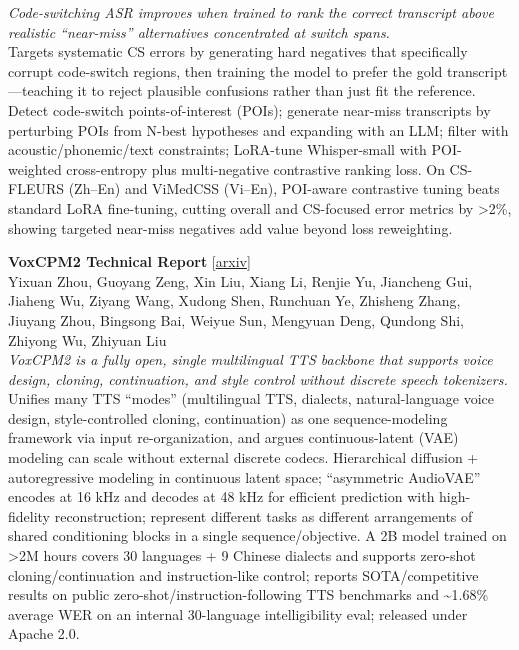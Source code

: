 \documentclass[12pt,letterpaper]{article}
\begin{document}
{\small\textit{Code-switching ASR improves when trained to rank the correct transcript above realistic ``near-miss'' alternatives concentrated at switch spans.}}\\[1pt]
{\footnotesize Targets systematic CS errors by generating hard negatives that specifically corrupt code-switch regions, then training the model to prefer the gold transcript---teaching it to reject plausible confusions rather than just fit the reference. Detect code-switch points-of-interest (POIs); generate near-miss transcripts by perturbing POIs from N-best hypotheses and expanding with an LLM; filter with acoustic/phonemic/text constraints; LoRA-tune Whisper-small with POI-weighted cross-entropy plus multi-negative contrastive ranking loss. On CS-FLEURS (Zh--En) and ViMedCSS (Vi--En), POI-aware contrastive tuning beats standard LoRA fine-tuning, cutting overall and CS-focused error metrics by >2\%, showing targeted near-miss negatives add value beyond loss reweighting.}

\medskip

{\small\textbf{VoxCPM2 Technical Report}} {\scriptsize[\href{https://arxiv.org/abs/2606.06928}{arxiv}]}\\
{\scriptsize Yixuan Zhou, Guoyang Zeng, Xin Liu, Xiang Li, Renjie Yu, Jiancheng Gui, Jiaheng Wu, Ziyang Wang, Xudong Shen, Runchuan Ye, Zhisheng Zhang, Jiuyang Zhou, Bingsong Bai, Weiyue Sun, Mengyuan Deng, Qundong Shi, Zhiyong Wu, Zhiyuan Liu}\\

{\small\textit{VoxCPM2 is a fully open, single multilingual TTS backbone that supports voice design, cloning, continuation, and style control without discrete speech tokenizers.}}\\[1pt]
{\footnotesize Unifies many TTS ``modes'' (multilingual TTS, dialects, natural-language voice design, style-controlled cloning, continuation) as one sequence-modeling framework via input re-organization, and argues continuous-latent (VAE) modeling can scale without external discrete codecs. Hierarchical diffusion + autoregressive modeling in continuous latent space; ``asymmetric AudioVAE'' encodes at 16 kHz and decodes at 48 kHz for efficient prediction with high-fidelity reconstruction; represent different tasks as different arrangements of shared conditioning blocks in a single sequence/objective. A 2B model trained on >2M hours covers 30 languages + 9 Chinese dialects and supports zero-shot cloning/continuation and instruction-like control; reports SOTA/competitive results on public zero-shot/instruction-following TTS benchmarks and \textasciitilde{}1.68\% average WER on an internal 30-language intelligibility eval; released under Apache 2.0.}
\end{document}

